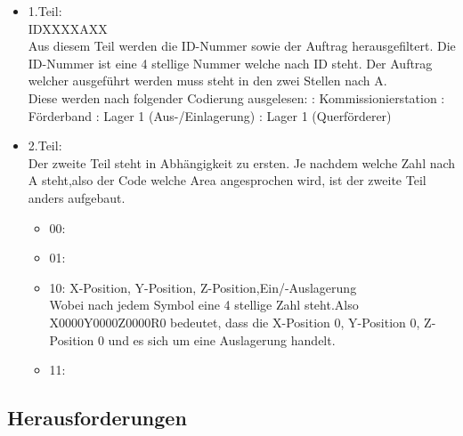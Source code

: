        \begin{itemize}
            \item 1.Teil: \\
            IDXXXXAXX \\
            Aus diesem Teil werden die ID-Nummer sowie der Auftrag herausgefiltert. Die ID-Nummer ist eine 4 stellige Nummer welche nach ID steht. Der Auftrag welcher ausgeführt werden muss steht in den zwei Stellen nach A.\\
            Diese werden nach folgender Codierung ausgelesen:
                : Kommissionierstation
                : Förderband
                : Lager 1 (Aus-/Einlagerung)
                : Lager 1 (Querförderer)
            \item 2.Teil: \\
            Der zweite Teil steht in Abhängigkeit zu ersten. Je nachdem welche Zahl nach A steht,also der Code welche Area angesprochen wird, ist der zweite Teil anders aufgebaut.
                \begin{itemize}
                \item 00: 
                \item 01:
                \item{10: X-Position, Y-Position, Z-Position,Ein/-Auslagerung \\
                Wobei nach jedem Symbol eine 4 stellige Zahl steht.Also X0000Y0000Z0000R0 bedeutet, dass die 
                X-Position 0, Y-Position 0, Z-Position 0 und es sich um eine Auslagerung handelt.}
                \item 11:
                
                \end{itemize}
            
        \end{itemize}

\subsection{Herausforderungen}
